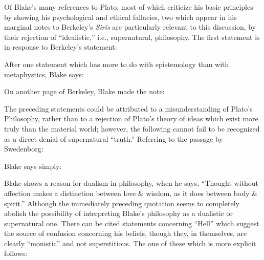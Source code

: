 Of Blake's many references to Plato, most of which criticize his basic principles by showing his psychological
and ethical fallacies, two which appear in his marginal notes to Berkeley's \emph{Siris} are particularly
relevant to this discussion, by their rejection of \enquote{idealistic,} i.e., supernatural, philosophy. The first statement
is in response to Berkeley's statement:


After one statement which has more to do with epistemology than with metaphystics, Blake says:


\noindent On another page of Berkeley, Blake made the note:


The preceding statements could be attributed to a misunderstanding of Plato's Philosophy, rather than to a rejection
of Plato's theory of ideas which exist more truly than the material world; however, the following cannot fail to be
recognized as a direct denial of supernatural \enquote{truth.} Referring to the passage by Swedenborg:


\noindent Blake says simply:


Blake shows a reason for dualism in philosophy, when he says, \enquote{Thought without affection makes a distinction
between love \& wisdom, as it does between body \& spirit.}\supercite{keynes:william-blake}
Although the immediately preceding quotation seems to completely abolish the possibility of interpreting
Blake's philosophy as a dualistic or supernatural one. There can be cited statements
concerning \enquote{Hell} which suggest the source of confusion concerning his beliefs,
though they, in themselves, are clearly \enquote{monistic} and not superstitious. The one of these which
is more explicit follows:

